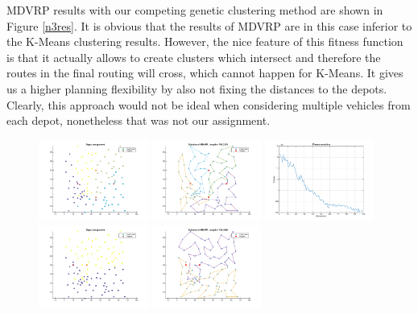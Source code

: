 \documentclass[conference]{IEEEtran}
\begin{document}
MDVRP results with our competing genetic clustering method are shown in Figure \ref{n3res}. It is obvious that the results of MDVRP are in this case inferior to the K-Means clustering results. However, the nice feature of this fitness function is that it actually allows to create clusters which intersect and therefore the routes in the final routing will cross, which cannot happen for K-Means. It gives us a higher planning flexibility by also not fixing the distances to the depots. Clearly, this approach would not be ideal when considering multiple vehicles from each depot, nonetheless that was not our assignment.
\begin{figure}
  \begin{center}
    \includegraphics[width=0.32\textwidth]{images/N3depot_assignment2}
    \includegraphics[width=0.32\textwidth]{images/N3solution2}
    \includegraphics[width=0.32\textwidth]{images/N3fitness2}
    \includegraphics[width=0.32\textwidth]{images/N3depot_assignment_p07altered}
    \includegraphics[width=0.32\textwidth]{images/N3solution_p07altered}

\end{center}
\end{figure}
\end{document}
